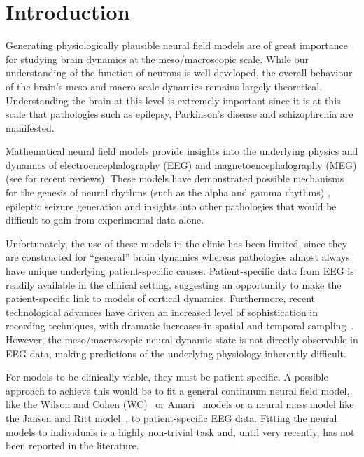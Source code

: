 \documentclass[10pt,a4paper]{article}
\begin{document}
\section{Introduction} 

Generating physiologically plausible neural field models are of great importance for studying brain dynamics at the meso/macroscopic scale. While our understanding of the function of neurons is well developed, the overall behaviour of the brain's meso and macro-scale dynamics remains largely theoretical. Understanding the brain at this level is extremely important since it is at this scale that pathologies such as epilepsy, Parkinson's disease and schizophrenia are manifested. 

Mathematical neural field models provide insights into the underlying physics and dynamics of electroencephalography (EEG) and magnetoencephalography (MEG) (see \cite{Deco2008,David2003} for recent reviews). These models have demonstrated possible mechanisms for the genesis of neural rhythms (such as the alpha and gamma rhythms) \cite{Liley1999,RENNIE2000}, epileptic seizure generation \cite{DaSilva2003,Suffczynski2004,Wendling2005} and insights into other pathologies \cite{Moran2008,Schiff2009} that would be difficult to gain from experimental data alone. 

Unfortunately, the use of these models in the clinic has been limited, since they are constructed for ``general'' brain dynamics whereas pathologies almost always have unique underlying patient-specific causes. Patient-specific data from EEG is readily available in the clinical setting, suggesting an opportunity to make the patient-specific link to models of cortical dynamics. Furthermore, recent technological advances have driven an increased level of sophistication in recording techniques, with dramatic increases in spatial and temporal sampling~\cite{Brinkmann2009}. However, the meso/macroscopic neural dynamic state is not directly observable in EEG data, making predictions of the underlying physiology inherently difficult.

For models to be clinically viable, they must be patient-specific. A possible approach to achieve this would be to fit a general continuum neural field model, like the Wilson and Cohen (WC)~\cite{Wilson1973} or Amari~\cite{Amari1977} models or a neural mass model like the Jansen and Ritt model~\cite{Jansen1995}, to patient-specific EEG data. Fitting the neural models to individuals is a highly non-trivial task and, until very recently, has not been reported in the literature. 
\end{document}
